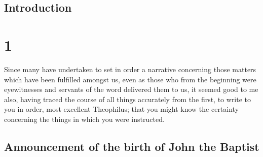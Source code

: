 \hypertarget{introduction}{%
\subsection{Introduction}\label{introduction}}

\hypertarget{section}{%
\section{1}\label{section}}

 Since many have undertaken to set in order a narrative
concerning those matters which have been fulfilled amongst us,
 even as those who from the beginning were eyewitnesses
and servants of the word delivered them to us,  it seemed
good to me also, having traced the course of all things accurately from
the first, to write to you in order, most excellent Theophilus;
 that you might know the certainty concerning the things
in which you were instructed.

\hypertarget{announcement-of-the-birth-of-john-the-baptist}{%
\subsection{Announcement of the birth of John the
Baptist}\label{announcement-of-the-birth-of-john-the-baptist}}

